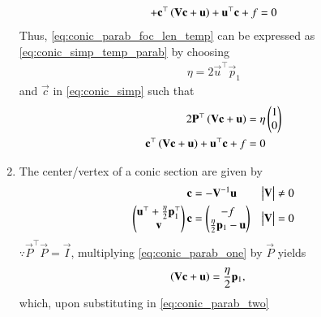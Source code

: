 \begin{enumerate}[label=\thesubsection.\arabic*.,ref=\thesubsection.\theenumi]
\begin{multline}
\\
	+  \mathbf{c}^{\top}\left(\mathbf{V}\mathbf{c} + \mathbf{u}\right)+ \mathbf{u}^{\top}\mathbf{c} + f= 0
\label{eq:conic_parab_foc_len_temp} 
\end{multline}
Thus, \eqref{eq:conic_parab_foc_len_temp} 
can be expressed as \eqref{eq:conic_simp_temp_parab} by choosing
\begin{align}
\eta = 2\vec{u}^{\top}\vec{p}_1
\end{align}
and $\vec{c}$ in \eqref{eq:conic_simp} such that
\begin{align}
\label{eq:conic_parab_one}
2\mathbf{P}^{\top}\left(\mathbf{V}\mathbf{c}+\mathbf{u}\right) &= \eta\begin{pmatrix}1\\0\end{pmatrix}
\\
\mathbf{c}^{\top}\left(\mathbf{V}\mathbf{c} + \mathbf{u}\right)+ \mathbf{u}^{\top}\mathbf{c} + f&= 0
\label{eq:conic_parab_two}
\end{align}
	\item
		The center/vertex of a conic section are given by
  \begin{align}
    \label{eq:conic_nonparab_c}
	    \mathbf{c} &= - \mathbf{V}^{-1}\mathbf{u}  & \begin{vmatrix}\mathbf{V}\end{vmatrix} \ne 0
    \\
	    \begin{pmatrix} \mathbf{u}^{\top}+\frac{\eta}{2}\mathbf{p}_1^{\top} \\ \mathbf{v}\end{pmatrix}\mathbf{c} &= \begin{pmatrix}-f \\ \frac{\eta}{2}\mathbf{p}_1-\mathbf{u}\end{pmatrix}  
& \begin{vmatrix}\mathbf{V}\end{vmatrix} = 0
    \label{eq:conic_parab_c}
    \end{align}	
\solution	
$\because
\vec{P}^{\top}\vec{P} = \vec{I}$,
multiplying \eqref{eq:conic_parab_one} by $\vec{P}$ yields
\begin{align}
\label{eq:conic_parab_one_eig}
	\left(\mathbf{V}\mathbf{c}+\mathbf{u}\right) &= \frac{\eta}{2}\mathbf{p}_1,
\end{align}
which, upon substituting in \eqref{eq:conic_parab_two}

\end{enumerate}
